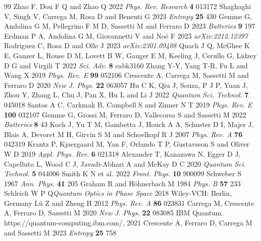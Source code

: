 \documentclass[12pt]{iopart}
\begin{document}
\begin{thebibliography}{99}
%
 Zhao F, Dou F Q and Zhao Q 2022 \emph{Phys. Rev. Research} \textbf{4} 013172
%
 Shaghaghi V, Singh V, Carrega M, Rosa D and Benenti G 2023 \emph{	Entropy} \textbf{25} 430
%
 Gemme G, Andolina G M, Pellegrino F M D, Sassetti M and Ferraro D 2023 \emph{Batteries} \textbf{9} 197
%
 Erdman P A, Andolina G M, Giovannetti V and No\'e F 2023 \emph{	arXiv:2212.12397}
%
 Rodriguez C, Rosa D and Olle J 2023 \emph{arXiv:2301.09408}
%
 Quach J Q, McGhee K E, Ganzer L, Rouse D M, Lovett B W, Gauger E M, Keeling J, Cerullo G, Lidzey D G and Virgili T 2022 \emph{Sci. Adv.} \textbf{8} eabk3160
%
  Zhang Y-Y, Yang T-R, Fu L and Wang X 2019 \emph{Phys. Rev. E} \textbf{99} 052106
%
  Crescente A, Carrega M, Sassetti M and Ferraro D 2020 \emph{New J. Phys.}
\textbf{22} 063057
%
 Hu C K, Qiu J, Souza, P J P, Yuan J, Zhou Y, Zhang L, Chu J, Pan X, Hu L and Li J 2022 \emph{Quantum Sci. Technol.} \textbf{7} 045018
%
 Santos A C, Carkmak B, Campbell S and Zinner N T 2019 \emph{Phys. Rev. E} \textbf{100} 032107
%
 Gemme G, Grossi M, Ferraro D, Vallecorsa S and Sassetti M 2022 \emph{Batteries} \textbf{8} 43
%
  Koch J, Yu T M, Gambetta J, Houck A A, Schuster D I, Majer J, Blais A, Devoret M H, Girvin S M and Schoelkopf R J 2007 \emph{Phys. Rev. A} \textbf{76} 042319
%
 Krantz P, Kjaergaard M, Yan F, Orlando T P, Gustavsson S and Oliver W D 2019 \emph{Appl. Phys. Rev.} \textbf{6} 021318
%
 Alexander T, Kanazawa N, Egger D J, Capelluto L, Wood C J, Javadi-Abhari A and McKay D C 2020 \emph{Quantum Sci. Technol.} \textbf{5} 044006
%
 Smith K N et al.%
2022 \emph{Front. Phys.} \textbf{10} 900099
%
 Schweber S 1967 \emph{Ann. Phys.} \textbf{41} 205
%
 Graham R and H\"ohnerbach M 1984 \emph{Phys. B} \textbf{57} 233
%
 Schleich W P Q\emph{Quantum Optics in Phase Space} 2018 Wiley-VCH: Berlin, Germany
%
 L\"u Z and Zheng H 2012 \emph{Phys. Rev. A} \textbf{86} 023831
%
  Carrega M, Crescente A, Ferraro D, Sassetti M 2020 \emph{New J. Phys.}
\textbf{22} 083085
%
 IBM Quantum. https://quantum-computing.ibm.com/, 2021
%
 Crescente A, Ferraro D, Carrega M and Sassetti M 2023 \emph{Entropy} \textbf{25} 758

\end{thebibliography}
\end{document}

